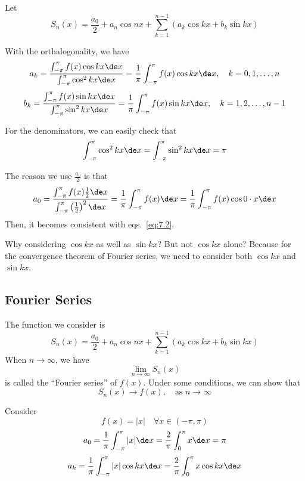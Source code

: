 \vspace{1em}

Let \[
    S_n(x) = \frac{a_0}{2} + a_n \cos nx + \sum_{k=1}^{n-1} (a_k \cos kx + b_k \sin kx)
\]

With the orthalogonality, we have \begin{equation}
    a_k = \frac{\int_{-\pi}^\pi f(x) \cos kx \de x}{\int_{-\pi}^\pi \cos^2 kx \de x} = \frac{1}{\pi} \int_{-\pi}^\pi f(x) \cos kx \de x, \quad k=0,1,\dots,n \label{eq:7.2}
\end{equation}
\begin{equation*}
    b_k = \frac{\int_{-\pi}^\pi f(x) \sin kx \de x}{\int_{-\pi}^\pi \sin^2 kx \de x} = \frac{1}{\pi} \int_{-\pi}^\pi f(x) \sin kx \de x, \quad k=1,2,\dots,n-1
\end{equation*}

For the denominators, we can easily check that \[
    \int_{-\pi}^\pi \cos^2 kx \de x = \int_{-\pi}^\pi \sin^2 kx \de x = \pi
\]

\begin{note}
    The reason we use $\frac{a_0}{2}$ is that \[
        a_0 = \frac{\int_{-\pi}^\pi f(x) \frac{1}{2} \de x}{\int_{-\pi}^\pi \left(\frac{1}{2}\right)^2 \de x} = \frac{1}{\pi} \int_{-\pi}^\pi f(x) \de x = \frac{1}{\pi} \int_{-\pi}^\pi f(x) \cos 0 \cdot x \de x
    \]
    Then, it becomes consistent with eqs.~\ref{eq:7.2}.
\end{note}

\begin{remark}
    Why considering $\cos kx$ as well as $\sin kx$? But not $\cos kx$ alone? Because for the convergence theorem of Fourier series, we need to consider both $\cos kx$ and $\sin kx$.
\end{remark}

\subsection{Fourier Series}

The function we consider is
\[
    S_n(x) = \frac{a_0}{2} + a_n \cos nx + \sum_{k=1}^{n-1} (a_k \cos kx + b_k \sin kx)
\]
When $n \to \infty$, we have \[
    \lim_{n \to \infty} S_n(x)
\]
is called the ``Fourier series'' of $f(x)$. Under some conditions, we can show that \[
    S_n(x) \to f(x), \quad \mbox{as } n \to \infty
\]

Consider \[
    f(x) = |x| \quad \forall x \in (-\pi, \pi)
\]
\[
    a_0 = \frac{1}{\pi} \int_{-\pi}^\pi |x| \de x = \frac{2}{\pi} \int_0^\pi x \de x = \pi
\]
\begin{equation}
    a_k = \frac{1}{\pi} \int_{-\pi}^\pi |x| \cos kx \de x = \frac{2}{\pi} \int_0^\pi x \cos kx \de x \label{eq:7.3}
\end{equation}

